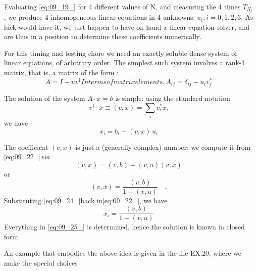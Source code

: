Evaluating \ref{eq:09_19_} for 4 different values of N, and measuring the 4
times $T_{N_i}$ , we produce 4 inhomogeneous linear equations in 4 
unknowns: $a_i , i = 0, 1, 2, 3$. As luck would have it, we just happen to have on hand a linear equation solver, and are thus in a
position to determine these coefficients numerically.

For this timing and testing chore we need an exactly soluble dense
system of linear equations, of arbitrary order. The simplest such
system involves a rank-1 matrix, that is, a matrix of the form :
\begin{subequations}
\begin{equation}
 \label{eq:09_20_}
A = I - u v^\dagger
\end{equation}
In terms of matrix elements,

\begin{equation}
 \label{eq:09_20prime_}
    A_{ij} = \delta_{ij} - u_i v_j^*
\end{equation}
\end{subequations}

The solution of the system $A\cdot x = b$ is simple: using the standard
notation
\begin{equation}
 \label{eq:09_21_}
    v^\dagger \cdot x \equiv (v,x) = \sum_{i}v_i^*x_i
\end{equation}
we have
\begin{equation}
 \label{eq:09_22_}
    x_i = b_i + (v,x)\,u_i
\end{equation}

The coefficient $(v, x)$ is just a (generally complex) number; we
compute it from \ref{eq:09_22_}\textit{via}
\begin{equation}
 \label{eq:09_23_}
    (v,x)=(v,b)+(v,u)(v,x)
\end{equation}
or
\begin{equation}
 \label{eq:09_24_}
    (v,x)=\frac{(v,b)}{1-(v,u)}\quad .
\end{equation}
Substituting \ref{eq:09_24_}back in\ref{eq:09_22_}, we have
\begin{equation}
 \label{eq:09_25_}
    x_i=\frac{(v,b)}{1-(v,u)}
\end{equation}
Everything in \ref{eq:09_25_} is determined, hence the solution is known in
closed form.

An example that embodies the above idea is given in the file
EX.20, where we make the special choices

